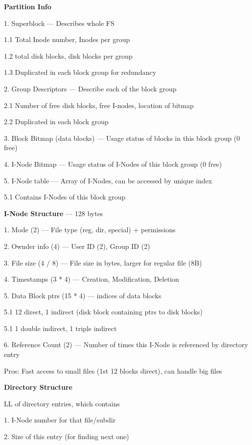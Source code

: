 \documentclass[10pt, a4paper]{article}
\newcommand{\blue}[1]{{\color{MidnightBlue}#1}}
\newcommand{\green}[1]{{\color{ForestGreen}#1}}
\newcommand{\tab}[0]{\hspace*{2mm}}
\begin{document}
\begin{multicols*}{3}
		\textbf{Partition Info}

		1. Superblock --- Describes whole FS 

		\tab{} 1.1 Total Inode number, Inodes per group
		
		\tab{} 1.2 total disk blocks, disk blocks per group

		\tab{} 1.3 Duplicated in each block group for redundancy

		2. Group Descriptors --- Describe each of the block group

		\tab{} 2.1 Number of free disk blocks, free I-nodes, location of bitmap

		\tab{} 2.2 Duplicated in each block group 

		3. Block Bitmap (data blocks) --- Usage status of blocks in this block group (0 free)
		
		4. I-Node Bitmap --- Usage status of I-Nodes of this block group (0 free)

		5. I-Node table --- Array of I-Nodes, can be accessed by unique index

		\tab{} 5.1 Contains I-Nodes of this block group

		\textbf{I-Node Structure} --- 128 bytes

		1. Mode (2) --- File type (reg, dir, special) + permissions

		2. Ownder info (4) --- User ID (2), Group ID (2)

		3. File size (4 / 8) --- File size in bytes, larger for regular file (8B)

		4. Timestamps (3 * 4) --- Creation, Modification, Deletion

		5. Data Block ptrs (15 * 4) --- indices of data blocks
		
		\tab{} 5.1 12 direct, 1 indirect (disk block containing ptrs to disk blocks)
		
		\tab{} 5.1 1 double indirect, 1 triple indirect

		6. Reference Count (2) --- Number of times this I-Node is referenced by directory entry


		\green{Pros}: Fast access to small files (1st 12 blocks direct), can handle \blue{big} files

		\textbf{Directory Structure}

		\blue{LL} of directory entries, which contains

		1. I-Node number for that file/subdir

		2. Size of this entry (for finding next one)


\end{multicols*}
\end{document}
